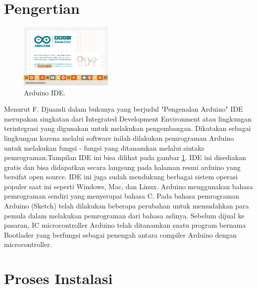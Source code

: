 ﻿	%

\section{Pengertian}

\begin{figure}[ht]
\centerline{\includegraphics[width=0.4\textwidth]{figures/aride11.png}}
\caption{Arduino IDE.}
\label{aide}
\end{figure}

Menurut F. Djuandi dalam bukunya yang berjudul "Pengenalan Arduino" \cite{djuandi2011pengenalan} IDE merupakan singkatan dari Integrated Development Environment atau lingkungan terintegrasi yang digunakan untuk melakukan pengembangan. Dikatakan sebagai lingkungan karena melalui software inilah dilakukan pemrograman Arduino untuk melakukan fungsi - fungsi yang ditanamkan melalui sintaks pemrograman.Tampilan IDE ini bisa dilihat pada gambar \ref{aide}. IDE ini disediakan gratis dan bisa didapatkan secara langsung pada halaman resmi arduino yang bersifat open source. IDE ini juga sudah mendukung berbagai sistem operasi populer saat ini seperti Windows, Mac, dan Linux. Arduino menggunakan bahasa pemrograman sendiri yang menyerupai bahasa C. Pada bahasa pemrograman Arduino (Sketch) telah dilakukan beberapa perubahan untuk memudahkan para pemula dalam melakukan pemrograman dari bahasa aslinya. Sebelum dijual ke pasaran, IC microcontroller Arduino telah ditanamkan suatu program bernama Bootlader yang berfungsi sebagai penengah antara compiler Arduino dengan microcontroller.



\section{Proses Instalasi}

